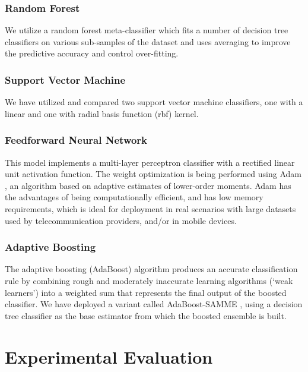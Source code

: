 \documentclass[letterpaper]{article}
\begin{document}
\subsubsection{Random Forest}  \label{Random Forest}

We utilize a random forest meta-classifier which fits a number of decision tree classifiers on various sub-samples of the dataset and uses averaging to improve the predictive accuracy and control over-fitting. 

\subsubsection{Support Vector Machine}  \label{Support Vector Machine}

We have utilized and compared two support vector machine classifiers, one with a linear and one with radial basis function (rbf) kernel. 

\subsubsection{Feedforward Neural Network}  \label{Feedforward Neural Network}

This model implements a multi-layer perceptron classifier with a rectified linear unit activation function. The weight optimization is being performed using Adam \cite{DBLP:journals/corr/KingmaB14}, an algorithm based on adaptive estimates of lower-order moments. Adam has the advantages of being computationally efficient, and has low memory requirements, which is ideal for deployment in real scenarios with large datasets used by telecommunication providers, and/or in mobile devices.

\subsubsection{Adaptive Boosting}  \label{Adaptive Boosting}

The adaptive boosting (AdaBoost) algorithm \cite{freund1997decision} produces an accurate classification rule by combining rough and moderately inaccurate learning algorithms (`weak learners') into a weighted sum that represents the final output of the boosted classifier. We have deployed a variant called AdaBoost-SAMME \cite{hastie2009multi}, using a decision tree classifier as the base estimator from which the boosted ensemble is built.

\section{Experimental Evaluation} \label{Experimental Evaluation}
\end{document}
